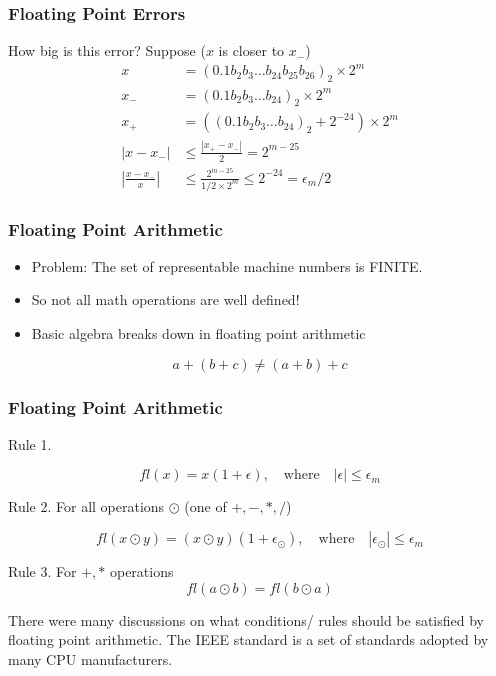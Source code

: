 \documentclass[10pt]{beamer}
\begin{document}
\begin{frame}
\frametitle{Floating Point Errors}
How big is this error?  Suppose ($x$ is closer to $x_-$)
\begin{align*}
  x                  & = (0.1b_2b_3\dots b_{24}b_{25}b_{26})_2\times 2^{m}\\
  x_{-}              & = (0.1b_2b_3\dots b_{24})_2\times 2^{m}\\
  x_{+}              & = \left((0.1b_2b_3\dots b_{24})_2 + 2^{-24}\right)\times 2^{m}\\
  |x-x_{-}|          &\leq \frac{|x_{+}-x_{-}|}{2}=2^{m-25}\\
  \left|\frac{x-x_{-}}{x}\right| &\leq \frac{2^{m-25}}{1/2\times 2^{m}} \leq 2^{-24} = \epsilon_m/2
\end{align*}

\end{frame}
\begin{frame}
\frametitle{Floating Point Arithmetic}
\begin{itemize}
  \item Problem: The set of representable machine numbers is FINITE.
  \item So not all math operations are well defined!
  \item Basic algebra breaks down in floating point arithmetic
\end{itemize}
\begin{example}
\begin{equation*}
a+(b+c) \ne (a+b)+c
\end{equation*}
\end{example}
\begin{center}
\end{center}
\end{frame}
\begin{frame}
\frametitle{Floating Point Arithmetic}
\begin{block}{Rule 1.} 

\[fl(x) = x (1 + \epsilon), \quad \mbox{where} \quad 
|\epsilon| \le \epsilon_m\]
\end{block}

\begin{block}{Rule 2.} 
For all operations $\odot$ (one of $+, -, *, / $)

\[fl(x \odot y ) = (x \odot y) 
(1 + \epsilon_{\odot} ), \quad \mbox{where} \quad 
|\epsilon_\odot | \le \epsilon_m\]
\end{block}

\begin{block}{Rule 3.}
For $+, *$  operations \[fl(a \odot b) = fl(b \odot a)\]
\end{block}

There were many discussions on what conditions/ rules
should be satisfied by floating point arithmetic. 
The IEEE standard is a set of standards adopted by many
CPU manufacturers.
\end{frame}
\end{document}
